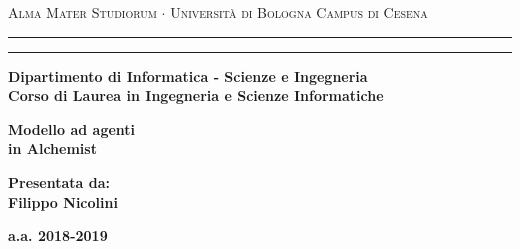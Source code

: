 \documentclass[12pt,a4paper]{report}
\begin{document}
\begin{titlepage}
\begin{center}
{{\Large{\textsc{Alma Mater Studiorum $\cdot$ Universit\`a di Bologna}}}}
{\small{\textsc{Campus di Cesena}}}
\rule[0.1cm]{15.8cm}{0.1mm}
\rule[0.5cm]{15.8cm}{0.6mm}
{\small{\bf Dipartimento di Informatica - Scienze e Ingegneria}}
\\
\medskip
{\small{\bf Corso di Laurea in Ingegneria e Scienze Informatiche}}
\end{center}
\vspace{15mm}
\begin{center}
{\LARGE{\bf Modello ad agenti}}\\
\vspace{3mm}
{\LARGE{\bf in Alchemist}}\\
\end{center}
\vspace{40mm}
\par
\noindent
\begin{minipage}[t]{0.47\textwidth}
\end{minipage}
\hfill
\begin{minipage}[t]{0.47\textwidth}\raggedleft
{\large{\bf Presentata da:\\
Filippo Nicolini}}
\end{minipage}
\vspace{20mm}
\begin{center}
{\large{\bf
a.a. 2018-2019 }}%
\end{center}
\end{titlepage}
\end{document}
